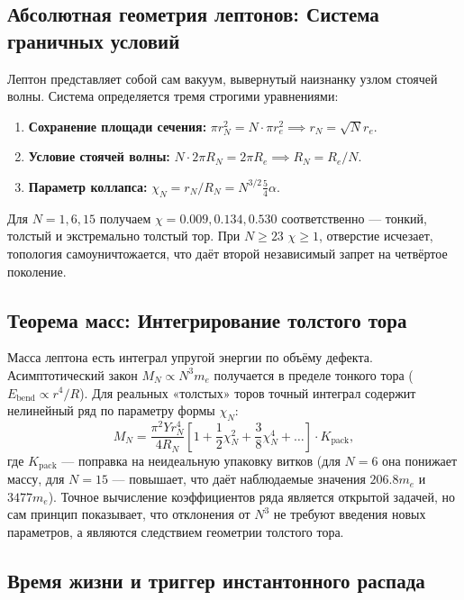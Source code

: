 \documentclass[11pt,a4paper]{article}
\begin{document}
\subsection{Абсолютная геометрия лептонов: Система граничных условий}

Лептон представляет собой сам вакуум, вывернутый наизнанку узлом стоячей волны. Система определяется тремя строгими уравнениями:
\begin{enumerate}
	\item \textbf{Сохранение площади сечения:} \( \pi r_N^2 = N \cdot \pi r_e^2 \implies r_N = \sqrt{N} r_e \).
	\item \textbf{Условие стоячей волны:} \( N \cdot 2\pi R_N = 2\pi R_e \implies R_N = R_e/N \).
	\item \textbf{Параметр коллапса:} \( \chi_N = r_N/R_N = N^{3/2} \frac{5}{4}\alpha \).
\end{enumerate}
Для \(N=1,6,15\) получаем \(\chi = 0.009, 0.134, 0.530\) соответственно — тонкий, толстый и экстремально толстый тор. При \(N \ge 23\) \(\chi \ge 1\), отверстие исчезает, топология самоуничтожается, что даёт второй независимый запрет на четвёртое поколение.

\subsection{Теорема масс: Интегрирование толстого тора}

Масса лептона есть интеграл упругой энергии по объёму дефекта. Асимптотический закон \(M_N \propto N^3 m_e\) получается в пределе тонкого тора (\(E_{\text{bend}} \propto r^4/R\)). Для реальных «толстых» торов точный интеграл содержит нелинейный ряд по параметру формы \(\chi_N\):
\begin{equation}
	M_N = \frac{\pi^2 Y r_N^4}{4 R_N} \left[ 1 + \frac{1}{2}\chi_N^2 + \frac{3}{8}\chi_N^4 + \dots \right] \cdot K_{\text{pack}},
\end{equation}
где \(K_{\text{pack}}\) — поправка на неидеальную упаковку витков (для \(N=6\) она понижает массу, для \(N=15\) — повышает, что даёт наблюдаемые значения \(206.8 m_e\) и \(3477 m_e\)). Точное вычисление коэффициентов ряда является открытой задачей, но сам принцип показывает, что отклонения от \(N^3\) не требуют введения новых параметров, а являются следствием геометрии толстого тора.

\subsection{Время жизни и триггер инстантонного распада}
\end{document}
